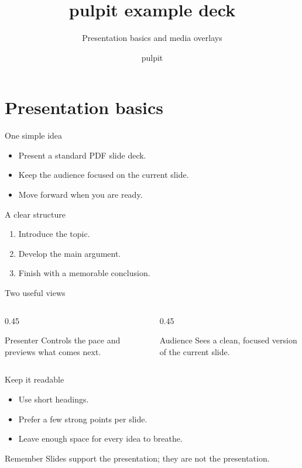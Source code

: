 \documentclass[aspectratio=169]{beamer}
\title{pulpit example deck}
\subtitle{Presentation basics and media overlays}
\author{pulpit}
\date{}
\begin{document}
\begin{frame}
  \titlepage
\end{frame}

\section{Presentation basics}

\begin{frame}{One simple idea}
  \begin{itemize}
    \item Present a standard PDF slide deck.
    \item Keep the audience focused on the current slide.
    \item Move forward when you are ready.
  \end{itemize}
\end{frame}

\begin{frame}{A clear structure}
  \begin{enumerate}
    \item Introduce the topic.
    \item Develop the main argument.
    \item Finish with a memorable conclusion.
  \end{enumerate}
\end{frame}

\begin{frame}{Two useful views}
  \begin{columns}[T]
    \begin{column}{0.45\textwidth}
      \begin{block}{Presenter}
        Controls the pace and previews what comes next.
      \end{block}
    \end{column}
    \begin{column}{0.45\textwidth}
      \begin{block}{Audience}
        Sees a clean, focused version of the current slide.
      \end{block}
    \end{column}
  \end{columns}
\end{frame}

\begin{frame}{Keep it readable}
  \begin{itemize}
    \item Use short headings.
    \item Prefer a few strong points per slide.
    \item Leave enough space for every idea to breathe.
  \end{itemize}

  \begin{alertblock}{Remember}
    Slides support the presentation; they are not the presentation.
  \end{alertblock}
\end{frame}
\end{document}
